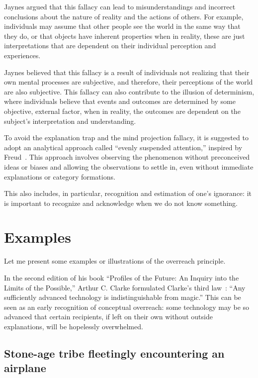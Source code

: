 Jaynes argued that this fallacy can lead to misunderstandings and incorrect conclusions about the nature of reality and the actions of others. For example, individuals may assume that other people see the world in the same way that they do, or that objects have inherent properties when in reality, these are just interpretations that are dependent on their individual perception and experiences.

Jaynes believed that this fallacy is a result of individuals not realizing that their own mental processes are subjective, and therefore, their perceptions of the world are also subjective. This fallacy can also contribute to the illusion of determinism, where individuals believe that events and outcomes are determined by some objective, external factor, when in reality, the outcomes are dependent on the subject's interpretation and understanding.

To avoid the explanation trap and the mind projection fallacy, it is suggested to adopt an analytical approach called ``evenly suspended attention,'' inspired by Freud~\cite{Freud-itp,Freud-itpe}. This approach involves observing the phenomenon without preconceived ideas or biases and allowing the observations to settle in, even without immediate explanations or category formations.

This also includes, in particular, recognition and estimation of one's ignorance:
it is important to recognize and acknowledge when we do not know something.

\section{Examples}


Let me present some examples or illustrations of the overreach principle.



In the second edition of his book ``Profiles of the Future: An Inquiry into the Limits of the Possible,'' Arthur C. Clarke formulated Clarke's third law~\cite{Clarke2000Jan}:
``Any sufficiently advanced technology is indistinguishable from magic.''
This can be seen as an early recognition of conceptual overreach: some technology may be so advanced
that certain recipients, if left on their own without outside explanations, will be hopelessly overwhelmed.

\subsection{Stone-age tribe fleetingly encountering an airplane}


